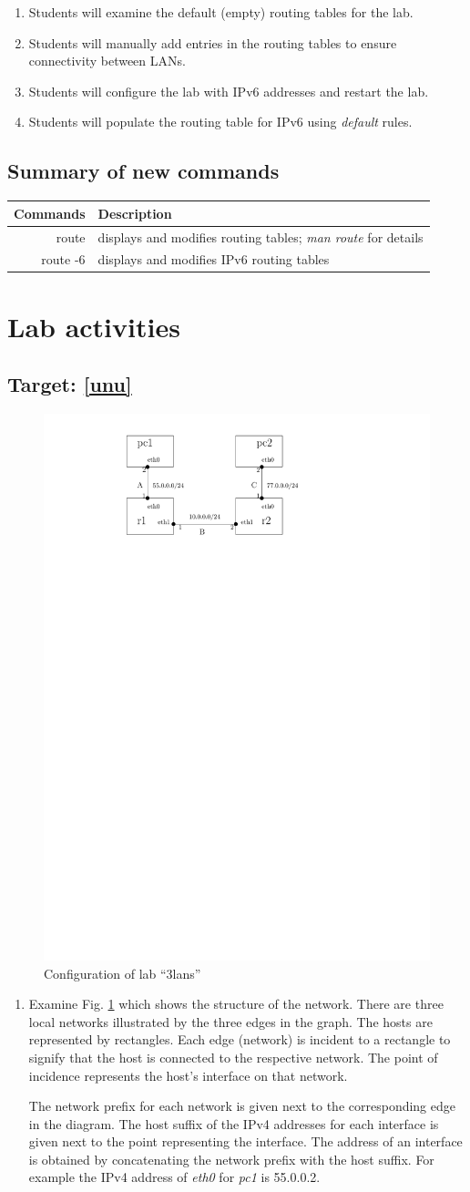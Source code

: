 \documentclass[12pt]{book}
\newcommand{\inspdf}[3]{
\begin{figure}[tb]
\begin{center}
\includegraphics[page=#1, scale=#2]{figs-manual/figs.pdf}
\end{center}
        \caption{#3}\label{f-#1}
\end{figure}
}
\begin{document}
\begin{enumerate}[label=\arabic*.]
\begin{enumerate}[label=Objective \arabic*:]
\item\label{unu} Students will examine the default (empty) routing tables for the lab.
\item\label{addroute} Students will manually add entries in the routing tables to ensure connectivity between LANs.
\item\label{addipv6} Students will configure the lab with IPv6 addresses and restart the lab.
\item\label{ipv6route} Students will populate the routing table for IPv6 using \emph{default} rules. 
\end{enumerate}


\subsection{Summary of new commands}

\begin{tabularx}{\textwidth}{r  X}
  Commands & Description \\ \midrule
  route & displays and modifies routing tables; \emph{man route} for details \\
  route -6 & displays and modifies IPv6 routing tables\\
\end{tabularx}


\section{Lab activities}

\subsection{Target: \ref{unu}}

\inspdf{1}{1}{Configuration of lab ``3lans''}

\begin{enumerate}[label=Activity \arabic*:]
\item Examine Fig. \ref{f-1} which shows the structure of the network. There are three local networks illustrated by the three edges in the graph. The hosts are represented by rectangles. Each edge (network) is incident to a rectangle to signify that the host is connected to the respective network. The point of incidence represents the host's interface on that network.

  The network prefix for each network is given next to the corresponding edge in the diagram. The host suffix of the IPv4 addresses for each interface is given next to the point representing the interface. The address of an interface is obtained by concatenating the network prefix with the host suffix. For example the IPv4 address of \emph{eth0} for \emph{pc1} is 55.0.0.2.


\end{enumerate}
\end{enumerate}
\end{document}
